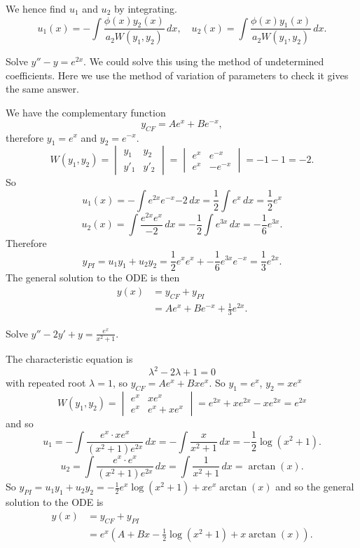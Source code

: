 \documentclass[10pt, a4paper]{article}
\begin{document}
We hence find $u_1$ and $u_2$ by integrating.
\[
u_1(x) = -\int\frac{\phi(x)y_2(x)}{a_2W(y_1, y_2)}\,dx,\quad u_2(x) = \int\frac{\phi(x)y_1(x)}{a_2W(y_1, y_2)}\,dx.
\]
\begin{example}
    Solve $y'' - y = e ^ {2x}$.
    We could solve this using the method of undetermined coefficients.
    Here we use the method of variation of parameters to check it gives the same answer.

    We have the complementary function
    \[
    y_{CF} = Ae ^ {x} + Be ^ {-x},
    \]
    therefore
    $y_1 = e ^ x$ and $y_2 = e ^ {-x}$.
    \[
    W(y_1, y_2) = \begin{vmatrix}
        y_1 & y_2 \\
        y'_1 & y'_2
    \end{vmatrix} = \begin{vmatrix}
        e ^ x & e ^ {-x} \\
        e ^ x & -e ^ {-x}
    \end{vmatrix} = -1 - 1 = -2.
    \]
    So
    \[
    u_1(x) = -\int{e ^ {2x}e ^ {-x}}{-2}\,dx = \frac{1}{2}\int e ^ {x}\,dx = \frac{1}{2}e ^ x
    \]
    \[
    u_2(x) = \int{\frac{e ^ {2x}e ^ {x}}{-2}}\,dx = -\frac{1}{2}\int e ^ {3x}\,dx = -\frac{1}{6}e ^ {3x}.
    \]
    Therefore
    \[
    y_{PI} = u_1y_1 + u_2y_2 = \frac{1}{2}e ^ xe ^ x + -\frac{1}{6}e ^ {3x}e ^ {-x} = \frac{1}{3}e ^ {2x}.
    \]
    The general solution to the ODE is then
    \begin{align*}
        y(x) &= y_{CF} + y_{PI} \\
        &= Ae ^ x + Be ^ {-x} + \frac{1}{3}e ^ {2x}.
    \end{align*}
\end{example}

\begin{example}
    Solve $y'' - 2y' + y = \frac{e ^ x}{x ^ 2 + 1}$.

    The characteristic equation is
    \[
    \lambda ^ 2 - 2\lambda + 1 = 0
    \]
    with repeated root $\lambda = 1$,
    so $y_{CF} = Ae ^ {x} + Bxe ^ {x}$.
    So $y_1 = e ^ x$,
    $y_2 = xe ^ x$
    \[
    W(y_1, y_2) = \begin{vmatrix}
        e ^ x & xe ^ x \\
        e ^ x & e ^ x + xe ^ x
    \end{vmatrix} = e ^ {2x} + xe ^ {2x} - xe ^ {2x} = e ^ {2x}
    \]
    and so
    \[
    u_1 = -\int\frac{e ^ x \cdot xe ^ x}{(x ^ 2 + 1)e ^ {2x}}\,dx = -\int\frac{x}{x ^ 2 + 1}\,dx = -\frac{1}{2}\log(x ^ 2 + 1).
    \]
    \[
    u_2 = \int\frac{e ^ x \cdot e ^ x}{(x ^ 2 + 1)e ^ {2x}}\,dx = \int\frac{1}{x ^ 2 + 1}\,dx = \arctan(x).
    \]
    So $y_{PI} = u_1y_1 + u_2y_2 = -\frac{1}{2}e ^ x\log(x ^ 2 + 1) + xe ^ x\arctan(x)$ and so the general solution to the ODE is
    \begin{align*}
        y(x) &= y_{CF} + y_{PI} \\
        &= e ^ x\left(A + Bx - \frac{1}{2}\log(x ^ 2 + 1) + x\arctan(x)\right).
    \end{align*}
\end{example}
\end{document}
